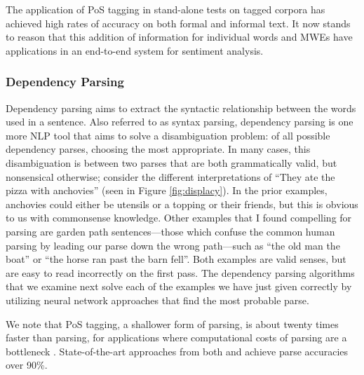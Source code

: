 {%


The application of PoS tagging in stand-alone tests on tagged corpora has achieved high rates of accuracy on both formal and informal text.
It now stands to reason that this addition of information for individual words and MWEs have applications in an end-to-end system for sentiment analysis.

\subsubsection{Dependency Parsing}

Dependency parsing aims to extract the syntactic relationship between the words used in a sentence.
Also referred to as syntax parsing, dependency parsing is one more NLP tool that aims to solve a disambiguation problem: of all possible dependency parses, choosing the most appropriate.
In many cases, this disambiguation is between two parses that are both grammatically valid, but nonsensical otherwise; consider the different interpretations of ``They ate the pizza with anchovies'' (seen in Figure \ref{fig:displacy}).
In the prior examples, anchovies could either be utensils or a topping or their friends, but this is obvious to us with commonsense knowledge.
Other examples that I found compelling for parsing are garden path sentences---those which confuse the common human parsing by leading our parse down the wrong path---such as ``the old man the boat'' or ``the horse ran past the barn fell''.
Both examples are valid senses, but are easy to read incorrectly on the first pass.
The dependency parsing algorithms that we examine next solve each of the examples we have just given correctly by utilizing neural network approaches that find the most probable parse.

We note that PoS tagging, a shallower form of parsing, is about twenty times faster than parsing, for applications where computational costs of parsing are a bottleneck \citep{handler2016bag}.
State-of-the-art approaches from both \cite{chen2014fast} and \cite{andor2016globally} achieve parse accuracies over 90\%.\\

}
